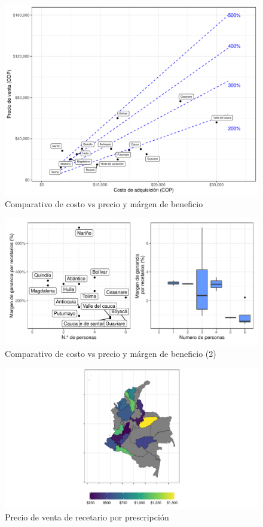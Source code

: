 \documentclass[
]{book}
\begin{document}
\begin{figure}
\includegraphics[width=0.9\linewidth]{InformeFinal_files/figure-latex/comparativoDepartamentos-1} \caption{Comparativo de costo vs precio y márgen de beneficio}\label{fig:comparativoDepartamentos}
\end{figure}

\begin{figure}
\centering
\includegraphics{InformeFinal_files/figure-latex/comparativoDepartamentos2-1.pdf}
\caption{\label{fig:comparativoDepartamentos2}Comparativo de costo vs precio y márgen de beneficio (2)}
\end{figure}

\begin{figure}
\includegraphics[width=0.9\linewidth]{InformeFinal_files/figure-latex/PVTA-Recetarios-1} \caption{Precio de venta de recetario por prescripción}\label{fig:PVTA-Recetarios}
\end{figure}
\end{document}
